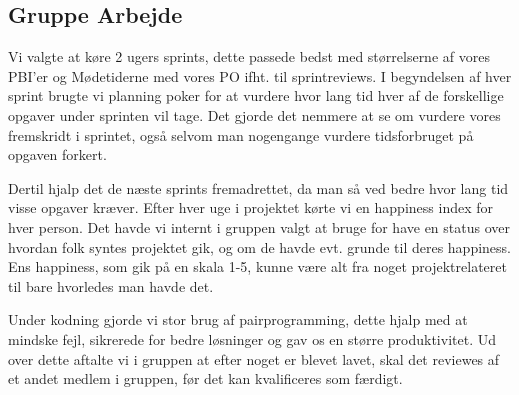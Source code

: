 \subsection{Gruppe Arbejde}
Vi valgte at køre 2 ugers sprints, dette passede bedst med størrelserne af vores
PBI'er og Mødetiderne med vores PO ifht. til sprintreviews.
I begyndelsen af hver sprint brugte vi planning poker for at vurdere hvor lang tid
hver af de forskellige opgaver under sprinten vil tage. Det gjorde det nemmere at se 
om vurdere vores fremskridt i sprintet, også selvom man nogengange vurdere tidsforbruget på opgaven forkert.


Dertil hjalp det de næste sprints fremadrettet, da man så ved bedre hvor lang tid visse opgaver kræver.
Efter hver uge i projektet kørte vi en happiness index for hver person. Det havde vi internt i gruppen valgt
at bruge for have en status over hvordan folk syntes projektet gik, og om de havde evt. grunde til deres happiness.
Ens happiness, som gik på en skala 1-5, kunne være alt fra noget projektrelateret til bare hvorledes man havde det.

Under kodning gjorde vi stor brug af pairprogramming, dette hjalp med at mindske fejl, sikrerede for bedre løsninger
og gav os en større produktivitet. Ud over dette aftalte vi i gruppen at efter noget er blevet lavet, 
skal det reviewes af et andet medlem i gruppen, før det kan kvalificeres som færdigt.